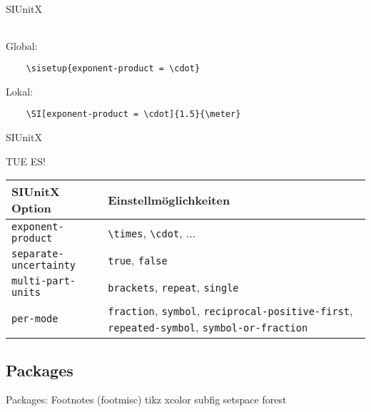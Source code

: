 \begin{frame}[fragile]{SIUnitX}
\begin{center}
\begin{tabular}{l >{\raggedright\arraybackslash}p{3cm} >{\raggedright\arraybackslash}p{1.5cm}}
			\bottomrule
		\end{tabular}
	\end{center}
	Global:\vspace{-0.1cm}
	\begin{lstlisting}
	\sisetup{exponent-product = \cdot}
	\end{lstlisting}
	\vspace{-0.2cm}Lokal:\vspace{-0.1cm}
	\begin{lstlisting}
	\SI[exponent-product = \cdot]{1.5}{\meter}
	\end{lstlisting}
\end{frame}
\begin{frame}[fragile]{SIUnitX}
	\begin{Aufgabe}
		TUE ES!
	\end{Aufgabe}
	\btVFill\Befehle
	\begin{center}
		\begin{tabular}{l >{\raggedright\arraybackslash}p{5cm}}
			\toprule
			SIUnitX Option						&	Einstellmöglichkeiten										\\ \midrule
			\lstinline|exponent-product|		&	\lstinline|\times|, \lstinline|\cdot|, ...					\\
			\lstinline|separate-uncertainty|	&	\lstinline|true|, \lstinline|false|							\\
			\lstinline|multi-part-units|		&	\lstinline|brackets|, \lstinline|repeat|, \lstinline|single|	\\
			\lstinline|per-mode|				&	\lstinline|fraction|, \lstinline|symbol|, \lstinline|reciprocal-positive-first|, \lstinline|repeated-symbol|, \lstinline|symbol-or-fraction|	\\
			\bottomrule
		\end{tabular}
	\end{center}
	\vspace{0.1cm}
\end{frame}


\subsection{Packages}
\begin{frame}[c]
	\begin{center}
		\large Packages:  Footnotes (footmisc)  
		tikz  xcolor subfig   setspace forest
	\end{center}
\end{frame}


